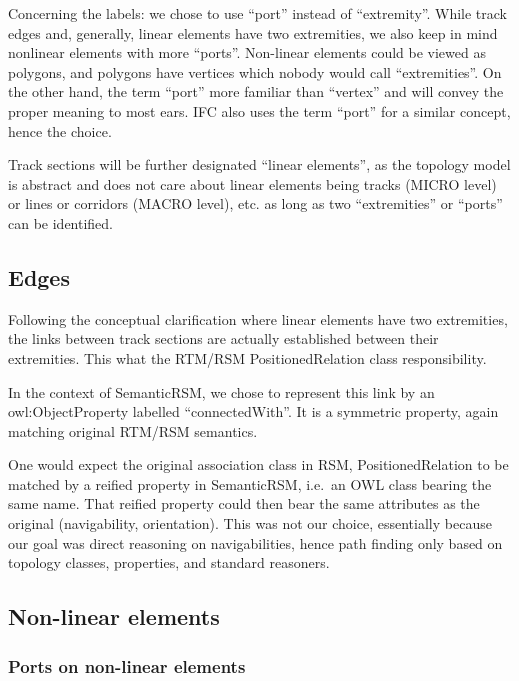 \documentclass[
  11pt,
]{article}
\begin{document}
Concerning the labels: we chose to use ``port'' instead of
``extremity''. While track edges and, generally, linear elements have
two extremities, we also keep in mind nonlinear elements with more
``ports''. Non-linear elements could be viewed as polygons, and polygons
have vertices which nobody would call ``extremities''. On the other
hand, the term ``port'' more familiar than ``vertex'' and will convey
the proper meaning to most ears. IFC also uses the term ``port'' for a
similar concept, hence the choice.

Track sections will be further designated ``linear elements'', as the
topology model is abstract and does not care about linear elements being
tracks (MICRO level) or lines or corridors (MACRO level), etc. as long
as two ``extremities'' or ``ports'' can be identified.

\hypertarget{edges}{%
\subsection{Edges}\label{edges}}

Following the conceptual clarification where linear elements have two
extremities, the links between track sections are actually established
between their extremities. This what the RTM/RSM PositionedRelation
class responsibility.

In the context of SemanticRSM, we chose to represent this link by an
owl:ObjectProperty labelled ``connectedWith''. It is a symmetric
property, again matching original RTM/RSM semantics.

One would expect the original association class in RSM,
PositionedRelation to be matched by a reified property in SemanticRSM,
i.e.~an OWL class bearing the same name. That reified property could
then bear the same attributes as the original (navigability,
orientation). This was not our choice, essentially because our goal was
direct reasoning on navigabilities, hence path finding only based on
topology classes, properties, and standard reasoners.

\hypertarget{non-linear-elements}{%
\subsection{Non-linear elements}\label{non-linear-elements}}

\hypertarget{ports-on-non-linear-elements}{%
\subsubsection{Ports on non-linear
elements}\label{ports-on-non-linear-elements}}
\end{document}
